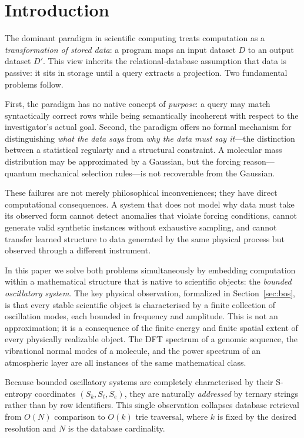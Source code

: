\documentclass[10pt,twocolumn]{article}
\begin{document}
\section{Introduction}
\label{sec:intro}

The dominant paradigm in scientific computing treats computation as a
\emph{transformation of stored data}: a program maps an input dataset $D$ to
an output dataset $D'$. This view inherits the relational-database assumption
that data is passive: it sits in storage until a query extracts a projection.
Two fundamental problems follow.

First, the paradigm has no native concept of \emph{purpose}: a query may match
syntactically correct rows while being semantically incoherent with respect to the
investigator's actual goal. Second, the paradigm offers no formal mechanism for
distinguishing \emph{what the data says} from \emph{why the data must say it}---the
distinction between a statistical regularty and a structural constraint.
A molecular mass distribution may be approximated by a Gaussian, but the forcing
reason---quantum mechanical selection rules---is not recoverable from the Gaussian.

These failures are not merely philosophical inconveniences; they have
direct computational consequences. A system that does not model why data must
take its observed form cannot detect anomalies that violate forcing conditions,
cannot generate valid synthetic instances without exhaustive sampling, and cannot
transfer learned structure to data generated by the same physical process
but observed through a different instrument.

In this paper we solve both problems simultaneously by embedding computation
within a mathematical structure that is native to scientific objects: the
\emph{bounded oscillatory system}.
The key physical observation, formalized in Section~\ref{sec:bos}, is that every
stable scientific object is characterised by a finite collection of
oscillation modes, each bounded in frequency and amplitude.
This is not an approximation; it is a consequence of the finite energy
and finite spatial extent of every physically realizable object.
The DFT spectrum of a genomic sequence, the vibrational normal modes of a
molecule, and the power spectrum of an atmospheric layer are all instances
of the same mathematical class.

Because bounded oscillatory systems are completely characterised by their
S-entropy coordinates $(S_k, S_t, S_e)$, they are naturally \emph{addressed}
by ternary strings rather than by row identifiers.
This single observation collapses database retrieval from $O(N)$ comparison
to $O(k)$ trie traversal, where $k$ is fixed by the desired resolution
and $N$ is the database cardinality.
\end{document}
